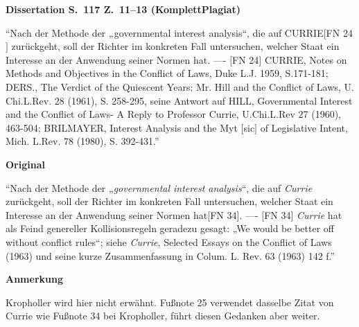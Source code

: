 \documentclass[ngerman,final,fontsize=12pt,paper=a4,twoside,bibliography=totocnumbered,BCOR=8mm,draft=false]{scrartcl}
\newenvironment{fragment}
	{\begin{snugshade}}
	{\end{snugshade}
	 \penalty-200
	 \vskip 0pt plus 10mm minus 5mm}
\newenvironment{fragmentpart}[1]
	{\noindent\textbf{#1}\par\penalty500}
	{\par}
\begin{document}
\begin{fragment}
\begin{fragmentpart}{Dissertation S.~117 Z.~11--13 (KomplettPlagiat)}
\enquote{Nach der Methode der „governmental interest analysis“, die auf CURRIE$[$FN 24$]$ zurückgeht, soll der Richter im konkreten Fall untersuchen, welcher Staat ein Interesse an der Anwendung seiner Normen hat.
----
$[$FN 24$]$ CURRIE, Notes on Methods and Objectives in the Conflict of Laws, Duke L.J. 1959, S.171-181; DERS., The Verdict of the Quiescent Years: Mr. Hill and the Conflict of Laws, U. Chi.L.Rev. 28 (1961), S. 258-295, seine Antwort auf HILL, Governmental Interest and the Conflict of Laws- A Reply to Professor Currie, U.Chi.L.Rev 27 (1960), 463-504; BRILMAYER, Interest Analysis and the Myt $[$sic$]$ of Legislative Intent, Mich. L.Rev. 78 (1980), S. 392-431.}
\end{fragmentpart}
\begin{fragmentpart}{Original \cite[S.~77 Z.~1--3]{Kropholler-1997}}
\enquote{Nach der Methode der „\textsl{governmental interest analysis}“, die auf \textsl{Currie} zurückgeht, soll der Richter im konkreten Fall untersuchen, welcher Staat ein Interesse an der Anwendung seiner Normen hat$[$FN 34$]$.
----
$[$FN 34$]$ \textsl{Currie} hat als Feind genereller Kollisionsregeln geradezu gesagt: „We would be better off without conflict rules“; siehe \textsl{Currie}, Selected Essays on the Conflict of Laws (1963) und seine kurze Zusammenfassung in Colum. L. Rev. 63 (1963) 142 f.}
\end{fragmentpart}
\begin{fragmentpart}{Anmerkung}
Kropholler wird hier nicht erwähnt. Fußnote 25 verwendet dasselbe Zitat von Currie wie Fußnote 34 bei Kropholler, führt diesen Gedanken aber weiter.
\end{fragmentpart}
\end{fragment}
\hypertarget{Lm-Fragment-118-05}{}
\end{document}
